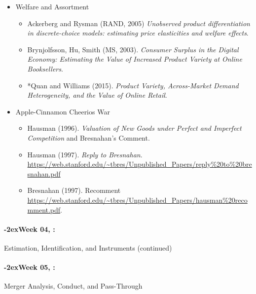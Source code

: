 \documentclass[11pt]{article}
\newcommand{\week}[1]{%
  \sbox{\weekdatebox}{\syldate{\today}}%
  \paragraph*{\kern-2ex\quad #1, \usebox{\weekdatebox}:}%
  \AdvanceDate[7]%
}
\begin{document}
\begin{itemize}
\begin{itemize}
\item Berry, Levinsohn, and Pakes (2004). \textit{Differentiated Products Demand Systems from a Combination of Micro and Macro Data: The New Car Market}.
\item Conlon and Gortmaker (2023, WP). \textit{Incorporating Micro Data into Differentiated Products Demand Estimation with pyBLP}.
\end{itemize}
\item Welfare and Assortment
\begin{itemize}
\item Ackerberg and Rysman (RAND, 2005) \textit{Unobserved product differentiation in discrete-choice models: estimating price elasticities and welfare effects}.
\item Brynjolfsson, Hu, Smith (MS, 2003). \textit{Consumer Surplus in the Digital Economy: Estimating the Value of Increased Product Variety at Online Booksellers}.
\item *Quan and Williams (2015). \textit{Product Variety, Across-Market Demand Heterogeneity, and the Value of Online Retail}.
\end{itemize}
\item Apple-Cinnamon Cheerios War
\begin{itemize}
\item Hausman (1996). \textit{Valuation of New Goods under Perfect and Imperfect Competition} and Bresnahan's Comment.
\item Hausman (1997). \textit{Reply to Bresnahan}. \url{https://web.stanford.edu/~tbres/Unpublished_Papers/reply%20to%20bresnahan.pdf}
\item Bresnahan (1997). Recomment \url{https://web.stanford.edu/~tbres/Unpublished_Papers/hausman%20recomment.pdf}.
\end{itemize}
\end{itemize}
\week{Week 04} Estimation, Identification, and Instruments (continued)
\week{Week 05} Merger Analysis, Conduct, and Pass-Through
\end{document}
